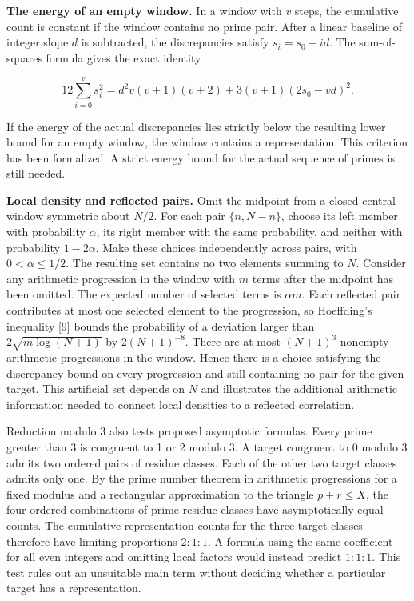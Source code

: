 \documentclass[11pt,a4paper]{article}
\begin{document}
\textbf{The energy of an empty window.} In a window with $v$ steps, the cumulative count is constant if the window contains no prime pair. After a linear baseline of integer slope $d$ is subtracted, the discrepancies satisfy $s_i=s_0-id$. The sum-of-squares formula gives the exact identity

\[
12\sum_{i=0}^{v}s_i^2=d^2v(v+1)(v+2)+3(v+1)(2s_0-vd)^2.
\]

If the energy of the actual discrepancies lies strictly below the resulting lower bound for an empty window, the window contains a representation. This criterion has been formalized. A strict energy bound for the actual sequence of primes is still needed.

\textbf{Local density and reflected pairs.} Omit the midpoint from a closed central window symmetric about $N/2$. For each pair $\{n,N-n\}$, choose its left member with probability $\alpha$, its right member with the same probability, and neither with probability $1-2\alpha$. Make these choices independently across pairs, with $0<\alpha\le1/2$. The resulting set contains no two elements summing to $N$. Consider any arithmetic progression in the window with $m$ terms after the midpoint has been omitted. The expected number of selected terms is $\alpha m$. Each reflected pair contributes at most one selected element to the progression, so Hoeffding's inequality [9] bounds the probability of a deviation larger than $2\sqrt{m\log(N+1)}$ by $2(N+1)^{-8}$. There are at most $(N+1)^3$ nonempty arithmetic progressions in the window. Hence there is a choice satisfying the discrepancy bound on every progression and still containing no pair for the given target. This artificial set depends on $N$ and illustrates the additional arithmetic information needed to connect local densities to a reflected correlation.

Reduction modulo 3 also tests proposed asymptotic formulas. Every prime greater than 3 is congruent to 1 or 2 modulo 3. A target congruent to 0 modulo 3 admits two ordered pairs of residue classes. Each of the other two target classes admits only one. By the prime number theorem in arithmetic progressions for a fixed modulus and a rectangular approximation to the triangle $p+r\le X$, the four ordered combinations of prime residue classes have asymptotically equal counts. The cumulative representation counts for the three target classes therefore have limiting proportions $2:1:1$. A formula using the same coefficient for all even integers and omitting local factors would instead predict $1:1:1$. This test rules out an unsuitable main term without deciding whether a particular target has a representation.
\end{document}
